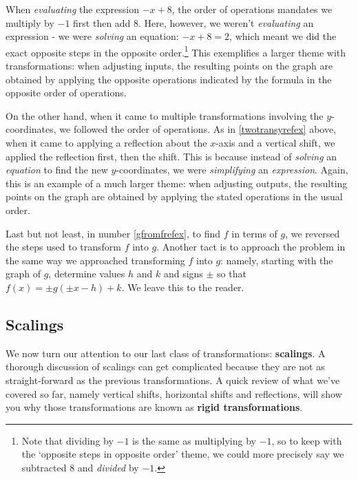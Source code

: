 \smallskip

When \textit{evaluating} the expression $-x+8$, the order of operations mandates we multiply by $-1$ first then add $8$.  Here, however, we weren't \textit{evaluating} an expression - we were \textit{solving} an equation:  $-x+8 = 2$, which meant we did the exact opposite steps in the opposite order.\footnote{Note that dividing by $-1$ is the same as multiplying by $-1$, so to keep with the `opposite steps in opposite order' theme, we could more precisely say we subtracted $8$ and \textit{divided} by $-1$.}  This exemplifies a larger theme with transformations:  when adjusting inputs, the resulting points on the graph are obtained by applying the opposite operations indicated by the formula in the opposite order of operations.



\smallskip


On the other hand, when it came to multiple transformations involving the $y$-coordinates, we followed the order of operations. As in \ref{twotransyrefex} above, when it came to applying a reflection about the $x$-axis and a vertical shift, we applied the reflection first, then the shift.  This is because instead of \textit{solving} an \textit{equation} to find the new $y$-coordinates, we were \textit{simplifying }an \textit{expression}.  Again, this is an example of a much larger theme:  when adjusting outputs, the resulting points on the graph are obtained by applying the stated operations in the usual order.


\smallskip


Last but not least, in number \ref{gfromfrefex}, to find $f$ in terms of $g$, we reversed the steps used to transform $f$ into $g$.  Another tact is to approach the problem in the same way we approached transforming $f$ into $g$: namely, starting with the graph of $g$, determine values $h$ and $k$ and signs $\pm$ so that $f(x) = \pm g(\pm x - h) + k$.  We leave this to the reader.


\subsection{Scalings}
\label{Scaling}

We now turn our attention to our last class of transformations: \textbf{scalings}.  A thorough discussion of scalings can get complicated because they are not as straight-forward as the previous transformations.  A quick review of what we've covered so far, namely vertical shifts, horizontal shifts and reflections, will show you why those transformations are known as \textbf{rigid transformations}.  

